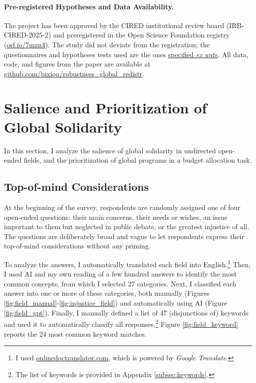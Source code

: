 \documentclass[12pt,english]{article}
\begin{document}
\begin{bibunit}
\paragraph{Pre-registered Hypotheses and Data Availability.}
The project has been approved by the CIRED institutional review board (IRB-CIRED-2025-2) and %
preregistered in the Open Science Foundation registry (\href{https://osf.io/7mzn4}{osf.io/7mzn4}). The study did not deviate from the registration; the questionnaires and hypotheses tests used are the ones \href{https://osf.io/j5scn}{specified \textit{ex ante}}. All data, code, and figures from the paper are available at \href{https://github.com/bixiou/robustness_global_redistr}{github.com/bixiou/robustness\_global\_redistr}. 


\section{Salience and Prioritization of Global Solidarity\label{sec:salience}}
In this section, I analyze the salience of global solidarity in undirected open-ended fields, and the prioritization of global programs in a budget allocation task.

\subsection{Top-of-mind Considerations}\label{subsec:considerations}

At the beginning of the survey, respondents are randomly assigned one of four open-ended questions: their main concerns, their needs or wishes, an issue important to them but neglected in public debate, or the greatest injustice of all. The questions are deliberately broad and vague to let respondents express their top-of-mind considerations without any priming. 

To analyze the answers, I automatically translated each field into English.\footnote{I used \href{https://www.onlinedoctranslator.com/en/translationform}{onlinedoctranslator.com}, which is powered by \textit{Google Translate}.} 
Then, I used AI and my own reading of a few hundred answers to identify the most common concepts, from which I selected 27 categories. Next, I classified each answer into one or more of these categories, both manually (Figures \ref{fig:field_manual}-\ref{fig:injustice_field}) and automatically using AI (Figure \ref{fig:field_gpt}). Finally, I manually defined a list of 47 (disjunctions of) keywords and used it to automatically classify all responses.\footnote{The list of keywords is provided in Appendix \ref{subsec:keywords}.} Figure \ref{fig:field_keyword} reports the 24 most common keyword matches. 


\end{bibunit}
\end{document}
